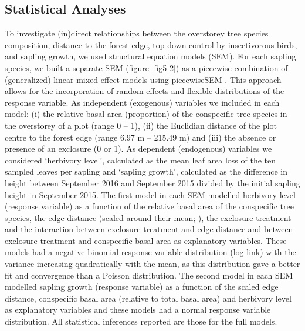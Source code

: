\documentclass[10pt, twoside]{book} %
\begin{document}
		\subsection*{Statistical Analyses}
		
		To investigate (in)direct relationships between the overstorey tree species composition, distance to the forest edge, top-down control by insectivorous birds, and sapling growth, we used structural equation models (SEM). For each sapling species, we built a separate SEM (figure \ref{fig5-2}) as a piecewise combination of (generalized) linear mixed effect models using piecewiseSEM \citep{Lefcheck2016}. This approach allows for the incorporation of random effects and flexible distributions of the response variable. As independent (exogenous) variables we included in each model: (i) the relative basal area (proportion) of the conspecific tree species in the overstorey of a plot (range 0 -- 1), (ii) the Euclidian distance of the plot centre to the forest edge (range 6.97 m -- 215.49 m) and (iii) the absence or presence of an exclosure (0 or 1). As dependent (endogenous) variables we considered `herbivory level', calculated as the mean leaf area loss of the ten sampled leaves per sapling and `sapling growth', calculated as the difference in height between September 2016 and September 2015 divided by the initial sapling height in September 2015. The first model in each SEM modelled herbivory level (response variable) as a function of the relative basal area of the conspecific tree species, the edge distance (scaled around their mean; \citealt{Schielzeth2010}), the exclosure treatment and the interaction between exclosure treatment and edge distance and between exclosure treatment and conspecific basal area as explanatory variables. These models had a negative binomial response variable distribution (log-link) with the variance increasing quadratically with the mean, as this distribution gave a better fit and convergence than a Poisson distribution. The second model in each SEM modelled sapling growth (response variable) as a function of the scaled edge distance, conspecific basal area (relative to total basal area) and herbivory level as explanatory variables and these models had a normal response variable distribution. All statistical inferences reported are those for the full models.\\
		
\end{document}
